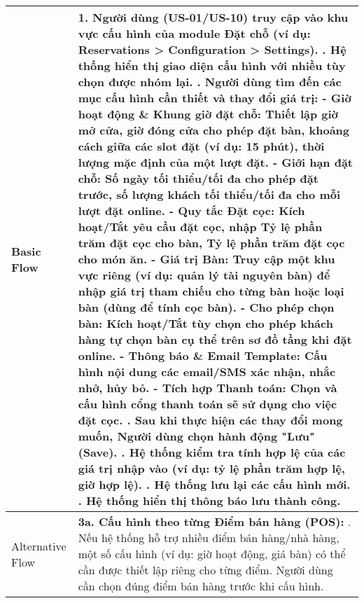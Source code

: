 \begin{longtable}{|m{4cm}|p{11cm}|}
Basic Flow & 1. Người dùng (US-01/US-10) truy cập vào khu vực cấu hình của module Đặt chỗ (ví dụ: Reservations > Configuration > Settings). \newline 2. Hệ thống hiển thị giao diện cấu hình với nhiều tùy chọn được nhóm lại. \newline 3. Người dùng tìm đến các mục cấu hình cần thiết và thay đổi giá trị: \newline    - \textbf{Giờ hoạt động \& Khung giờ đặt chỗ:} Thiết lập giờ mở cửa, giờ đóng cửa cho phép đặt bàn, khoảng cách giữa các slot đặt (ví dụ: 15 phút), thời lượng mặc định của một lượt đặt. \newline    - \textbf{Giới hạn đặt chỗ:} Số ngày tối thiểu/tối đa cho phép đặt trước, số lượng khách tối thiểu/tối đa cho mỗi lượt đặt online. \newline    - \textbf{Quy tắc Đặt cọc:} Kích hoạt/Tắt yêu cầu đặt cọc, nhập Tỷ lệ phần trăm đặt cọc cho bàn, Tỷ lệ phần trăm đặt cọc cho món ăn. \newline    - \textbf{Giá trị Bàn:} Truy cập một khu vực riêng (ví dụ: quản lý tài nguyên bàn) để nhập giá trị tham chiếu cho từng bàn hoặc loại bàn (dùng để tính cọc bàn). \newline    - \textbf{Cho phép chọn bàn:} Kích hoạt/Tắt tùy chọn cho phép khách hàng tự chọn bàn cụ thể trên sơ đồ tầng khi đặt online. \newline    - \textbf{Thông báo \& Email Template:} Cấu hình nội dung các email/SMS xác nhận, nhắc nhở, hủy bỏ. \newline    - \textbf{Tích hợp Thanh toán:} Chọn và cấu hình cổng thanh toán sẽ sử dụng cho việc đặt cọc. \newline 4. Sau khi thực hiện các thay đổi mong muốn, Người dùng chọn hành động "Lưu" (Save). \newline 5. Hệ thống kiểm tra tính hợp lệ của các giá trị nhập vào (ví dụ: tỷ lệ phần trăm hợp lệ, giờ hợp lệ). \newline 6. Hệ thống lưu lại các cấu hình mới. \newline 7. Hệ thống hiển thị thông báo lưu thành công. \\
\hline
Alternative Flow & \textbf{3a. Cấu hình theo từng Điểm bán hàng (POS):} \newline    1. Nếu hệ thống hỗ trợ nhiều điểm bán hàng/nhà hàng, một số cấu hình (ví dụ: giờ hoạt động, giá bàn) có thể cần được thiết lập riêng cho từng điểm. Người dùng cần chọn đúng điểm bán hàng trước khi cấu hình. \\
\hline

\end{longtable}

